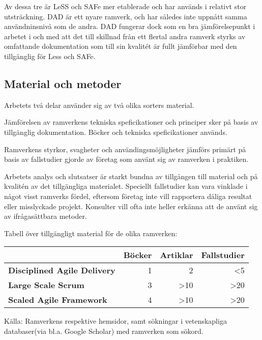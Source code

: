 Av dessa tre är LeSS och SAFe mer etablerade och har används i relativt stor utsträckning. DAD är ett nyare ramverk, och har således inte uppnått samma användninsnivå som de andra. DAD fungerar dock som en bra jämförelsepunkt i arbetet i och med att det till skillnad från ett flertal andra ramverk styrks av omfattande dokumentation som till sin kvalitét är fullt jämförbar med den tillgänglig för Less och SAFe. \cite{ask_matrix}


\subsection{Material och metoder}
Arbetets två delar använder sig av två olika sorters material.

Jämförelsen av ramverkens tekniska speficikationer och principer sker på basis av tillgänglig dokumentation. Böcker och tekniska speficikationer används.
\linebreak

Ramverkens styrkor, svagheter och användingsmöjligheter jämförs primärt på basis av fallstudier gjorde av företag som använt sig av ramverken i praktiken.



Arbetets analys och slutsatser är starkt bundna av tillgången till material och på kvalitén av det tillgängliga materialet. Speciellt fallstudier kan vara vinklade i något visst ramverks fördel, eftersom företag inte vill rapportera dåliga resultat eller misslyckade projekt. Konsulter vill ofta inte heller erkänna att de använt sig av ifrågasättbara metoder.


Tabell över tillgängligt material för de olika ramverken:

\begin{center}
\begin{tabular}{ >{\bfseries}l | r | r | r }
	  & Böcker & Artiklar & Fallstudier \\ \hline
	Disciplined Agile Delivery & 1 & 2 & <5 \\ \hline
	Large Scale Scrum & 3 & >10 & >20 \\ \hline
	Scaled Agile Framework & 4 & >10 & >20 \\ 
\end{tabular}
\end{center}

Källa: Ramverkens respektive hemsidor\cite{dad_web, less_web, safe_web}, samt sökningar i vetenskapliga databaser(via bl.a. Google Scholar) med ramverken som sökord.


